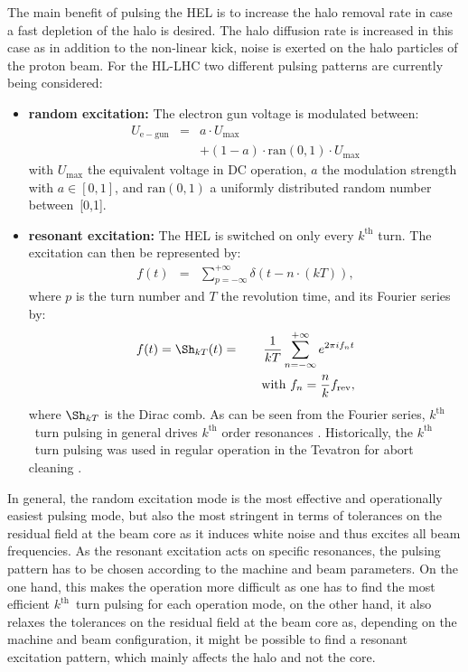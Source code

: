 \documentclass[%
 reprint,
 amsmath,amssymb,
 aps,
prstab,
]{revtex4-1}
\begin{document}
The main benefit of pulsing the HEL is to increase the halo removal rate in case a fast depletion of the halo is desired. The halo diffusion rate is increased in this case as in addition to the non-linear kick, noise is exerted on the halo particles of the proton beam. For the HL-LHC two different pulsing patterns are currently being considered:
\begin{itemize}
	\item \textbf{random excitation:} The electron gun voltage is modulated between:
	\begin{eqnarray}
		U_{\mathrm{e-gun}}&=&a\cdot U_{\mathrm{max}}\\
		& &+(1-a)\cdot \mathrm{ran}(0,1)\cdot U_{\mathrm{max}}
	\end{eqnarray}
	with $U_{\mathrm{max}}$ the equivalent voltage in DC operation, $a$ the modulation strength with $a\in[0,1]$, and $\mathrm{ran}(0,1)$ a uniformly distributed random number between~[0,1].
	\item \textbf{resonant excitation:} The HEL is switched on only every $k^{\mathrm{th}}$ turn. The excitation can then be represented by:
	\begin{eqnarray}\label{intro:eqn:1}
	f(t)&=&\sum_{p=-\infty}^{+\infty}\delta(t-n\cdot(kT)),
	\end{eqnarray}
	where $p$ is the turn number and $T$ the revolution time, and its Fourier series by:
	\begin{eqnarray}\label{intro:eqn:2}
	f(t)=\Sh_{kT}(t)
	&=&\frac{1}{kT}\sum_{n=-\infty}^{+\infty}e^{2\pi i f_nt} \\
	& & \quad \text{with} \ f_n=\frac{n}{k}f_{\rm rev},
	\end{eqnarray}
	where $\Sh_{kT}$ is the Dirac comb. As can be seen from the Fourier series, $k^{\mathrm{th}}$~turn pulsing in general drives $k^{\mathrm{th}}$ order resonances \cite{md_sim_hel_res_ex_fitterer}. Historically, the $k^{\mathrm{th}}$~turn pulsing was used in regular operation in the Tevatron for abort cleaning \cite{hel_tevatron_abortgap_zhang}.
\end{itemize}
In general, the random excitation mode is the most effective and operationally easiest pulsing mode, but also the most stringent in terms of tolerances on the residual field at the beam core as it induces white noise and thus excites all beam frequencies. As the resonant excitation acts on specific resonances, the pulsing pattern has to be chosen according to the machine and beam parameters. On the one hand, this makes the operation more difficult as one has to find the most efficient $k^{\mathrm{th}}$~turn pulsing for each operation mode, on the other hand, it also relaxes the tolerances on the residual field at the beam core as, depending on the machine and beam configuration, it might be possible to find a resonant excitation pattern, which mainly affects the halo and not the core.
\end{document}
